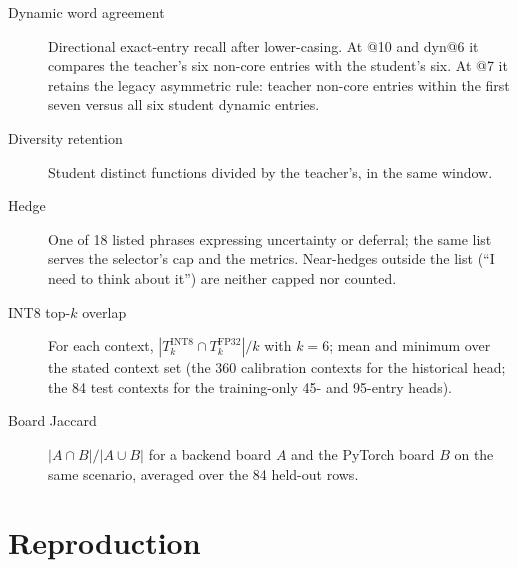 \begin{description}
\item[Dynamic word agreement] Directional exact-entry recall after lower-casing. At @10 and dyn@6 it compares the teacher's six non-core entries with the student's six. At @7 it retains the legacy asymmetric rule: teacher non-core entries within the first seven versus all six student dynamic entries. %
\item[Diversity retention] Student distinct functions divided by the teacher's, in the same window.
\item[Hedge] One of 18 listed phrases expressing uncertainty or deferral; the same list serves the selector's cap and the metrics. Near-hedges outside the list (``I need to think about it'') are neither capped nor counted.
\item[INT8 top-$k$ overlap] For each context, $|T_k^{\mathrm{INT8}}
\cap T_k^{\mathrm{FP32}}|/k$ with $k{=}6$; mean and minimum over the stated context set (the 360 calibration contexts for the historical head; the 84 test contexts for the training-only 45- and 95-entry heads).
\item[Board Jaccard] $|A\cap B|/|A\cup B|$ for a backend board $A$ and the PyTorch board $B$ on the same scenario, averaged over the 84 held-out rows.
\end{description}

\section{Reproduction}\label{app:repro}

